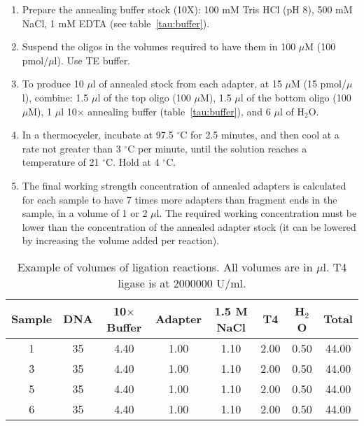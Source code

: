 \documentclass[a4paper,12pt]{article}
\begin{document}
\begin{enumerate}
\item Prepare the annealing buffer stock (10X): 100 mM Tris HCl (pH 8), 500 mM NaCl, 1 mM EDTA (see table~\ref{tau:buffer}).
\item Suspend the oligos in the volumes required to have them in 100 $\mu$M (100 pmol/$\mu$l). Use TE buffer.
\item To produce 10 $\mu$l of annealed stock from each adapter, at 15 $\mu$M (15 pmol/$\mu$l), combine: 1.5 $\mu$l of the top oligo (100 $\mu$M), 1.5 $\mu$l of the bottom oligo (100 $\mu$M), 1 $\mu$l 10$\times$ annealing buffer (table~\ref{tau:buffer}), and 6 $\mu$l of H$_2$O. 
\item In a thermocycler, incubate at 97.5 $^{\circ}$C for 2.5 minutes, and then cool at a rate not greater than 3 $^{\circ}$C per minute, until the solution reaches a temperature of 21 $^{\circ}$C. Hold at 4 $^{\circ}$C.
\item The final working strength concentration of annealed adapters is calculated for each sample to have 7 times more adapters than fragment ends in the sample, in a volume of 1 or 2 $\mu$l. The required working concentration must be lower than the concentration of the annealed adapter stock (it can be lowered by increasing the volume added per reaction).
\end{enumerate}

\begin{table}
\caption{Example of volumes of ligation reactions. All volumes are in $\mu$l. T4 ligase is at 2000000 U/ml.}\label{tau:ligation}
\vspace*{0.2cm}
\begin{tabular}{cccccccc}
\toprule
Sample&DNA&10$\times$ Buffer&Adapter&1.5 M NaCl&T4&H$_2$O&Total\\
\midrule
1&35&4.40&1.00&1.10&2.00&0.50&44.00\\
3&35&4.40&1.00&1.10&2.00&0.50&44.00\\
5&35&4.40&1.00&1.10&2.00&0.50&44.00\\
6&35&4.40&1.00&1.10&2.00&0.50&44.00\\
\bottomrule
\end{tabular}
\end{table}
\end{document}
